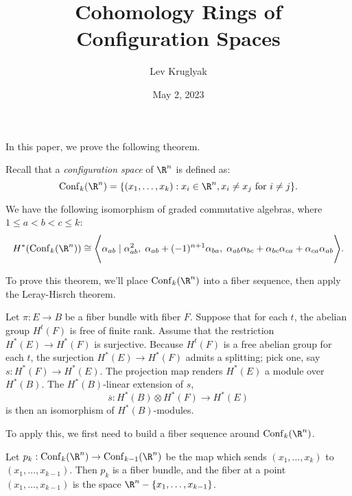 \documentclass[11pt,letterpaper]{article}
\title{Cohomology Rings of Configuration Spaces}
\author{Lev Kruglyak}
\date{May 2, 2023}
\providecommand{\conf}{\mathrm{Conf}}
\begin{document}
\maketitle

In this paper, we prove the following theorem.
\begin{definition}
    Recall that a \emph{configuration space} of $\R^n$ is defined as:
    \[
        \conf_k(\R^n) = \{ (x_1,\ldots,x_k) : x_i\in \R^n, x_i\neq x_j \textrm{ for }i\neq j\}
    .\] 
\end{definition}
\begin{theorem}
    We have the following isomorphism of graded commutative algebras, where $1\leq a<b<c\leq k$:
    \[
        H^*(\conf_k(\R^n)) \cong \Bigg\langle \alpha_{ab}\;{\mid}\; \alpha_{ab}^2,\; \alpha_{ab}+(-1)^{n+1}\alpha_{ba},\;\alpha_{ab}\alpha_{bc}+\alpha_{bc}\alpha_{ca}+\alpha_{ca}\alpha_{ab} \Bigg\rangle
    .\] 
\end{theorem}

To prove this theorem, we'll place $\conf_k(\R^n)$ into a fiber sequence, then apply the Leray-Hisrch theorem.

\begin{theorem}
    Let $\pi : E \to B$ be a fiber bundle with fiber $F$. Suppose that for each $t$, the abelian group $H^t(F)$ is free of finite rank. Assume that the restriction $H^*(E) \to H^*(F)$ is surjective. Because $H^t(F)$ is a free abelian group for each $t$, the surjection $H^*(E) \to H^*(F)$ admits a splitting; pick one, say $s : H^*(F) \to H^*(E)$. The projection map renders $H^*(E)$ a module over $H^*(B)$. The $H^*(B)$-linear extension of $s$,
    \[
        \overline{s} : H^*(B)\otimes H^*(F) \to H^*(E)
    \]
    is then an isomorphism of $H^*(B)$-modules. 
\end{theorem}

To apply this, we first need to build a fiber sequence around $\conf_k(\R^n)$. 

\begin{lemma}
    Let $p_k : \conf_k(\R^n) \to \conf_{k-1}(\R^n)$ be the map which sends $(x_1,\ldots,x_k)$ to $(x_1,\ldots,x_{k-1})$. Then $p_k$ is a fiber bundle, and the fiber at a point $(x_1,\ldots,x_{k-1})$ is the space $\R^n-\{x_1,\ldots,x_{k-1}\}$.
\end{lemma}
\end{document}
